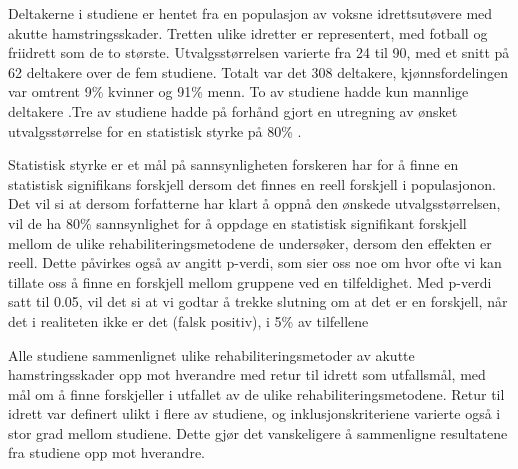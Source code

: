 \documentclass[
]{book}
\begin{document}
Deltakerne i studiene er hentet fra en populasjon av voksne idrettsutøvere med akutte hamstringsskader. Tretten ulike idretter er representert, med fotball og friidrett som de to største. Utvalgsstørrelsen varierte fra 24 til 90, med et snitt på 62 deltakere over de fem studiene. Totalt var det 308 deltakere, kjønnsfordelingen var omtrent 9\% kvinner og 91\% menn. To av studiene hadde kun mannlige deltakere \citep{hickey2020, hamilton2015}.Tre av studiene hadde på forhånd gjort en utregning av ønsket utvalgsstørrelse for en statistisk styrke på 80\% \citep{hickey2020, ahamid2014, hamilton2015}.

Statistisk styrke er et mål på sannsynligheten forskeren har for å finne en statistisk signifikans forskjell dersom det finnes en reell forskjell i populasjonon\citep[\citet{turner2018}]{jones2004}. Det vil si at dersom forfatterne har klart å oppnå den ønskede utvalgsstørrelsen, vil de ha 80\% sannsynlighet for å oppdage en statistisk signifikant forskjell mellom de ulike rehabiliteringsmetodene de undersøker, dersom den effekten er reell. Dette påvirkes også av angitt p-verdi, som sier oss noe om hvor ofte vi kan tillate oss å finne en forskjell mellom gruppene ved en tilfeldighet. Med p-verdi satt til 0.05, vil det si at vi godtar å trekke slutning om at det er en forskjell, når det i realiteten ikke er det (falsk positiv), i 5\% av tilfellene

Alle studiene sammenlignet ulike rehabiliteringsmetoder av akutte hamstringsskader opp mot hverandre med retur til idrett som utfallsmål, med mål om å finne forskjeller i utfallet av de ulike rehabiliteringsmetodene. Retur til idrett var definert ulikt i flere av studiene, og inklusjonskriteriene varierte også i stor grad mellom studiene. Dette gjør det vanskeligere å sammenligne resultatene fra studiene opp mot hverandre.
\end{document}
